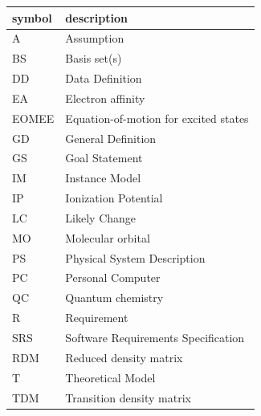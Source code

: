 \documentclass[12pt]{article}
\begin{document}
\renewcommand{\arraystretch}{1.2}
\begin{tabular}{l l} 
  \toprule		
  \textbf{symbol} & \textbf{description}\\
  \midrule 
  A & Assumption\\
  BS & Basis set(s)\\
  DD & Data Definition\\
  EA & Electron affinity\\
  EOMEE& Equation-of-motion for excited states\\
  GD & General Definition\\
  GS & Goal Statement\\
  IM & Instance Model\\
  IP & Ionization Potential\\
  LC & Likely Change\\
  MO & Molecular orbital\\
  PS & Physical System Description\\
  PC & Personal Computer\\
  QC & Quantum chemistry\\
  R & Requirement\\
  SRS & Software Requirements Specification\\
  RDM & Reduced density matrix\\
  T & Theoretical Model\\
  TDM & Transition density matrix\\
  \bottomrule
\end{tabular}\\


\newpage




\end{document}

